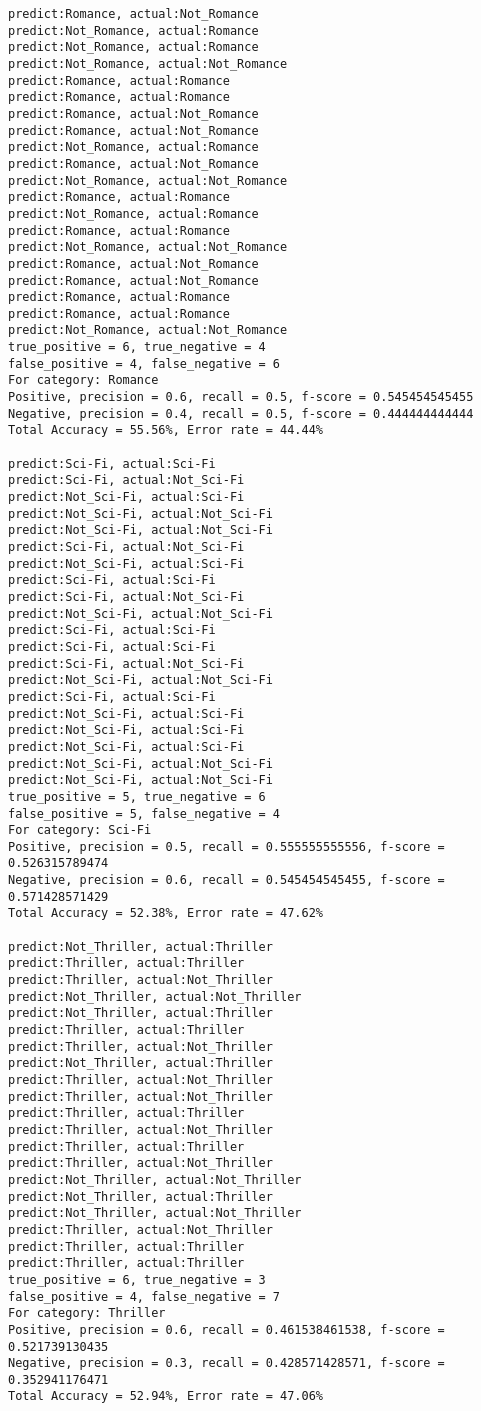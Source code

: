 \documentclass{article}
\begin{document}
\begin{lstlisting}
predict:Romance, actual:Not_Romance
predict:Not_Romance, actual:Romance
predict:Not_Romance, actual:Romance
predict:Not_Romance, actual:Not_Romance
predict:Romance, actual:Romance
predict:Romance, actual:Romance
predict:Romance, actual:Not_Romance
predict:Romance, actual:Not_Romance
predict:Not_Romance, actual:Romance
predict:Romance, actual:Not_Romance
predict:Not_Romance, actual:Not_Romance
predict:Romance, actual:Romance
predict:Not_Romance, actual:Romance
predict:Romance, actual:Romance
predict:Not_Romance, actual:Not_Romance
predict:Romance, actual:Not_Romance
predict:Romance, actual:Not_Romance
predict:Romance, actual:Romance
predict:Romance, actual:Romance
predict:Not_Romance, actual:Not_Romance
true_positive = 6, true_negative = 4
false_positive = 4, false_negative = 6
For category: Romance
Positive, precision = 0.6, recall = 0.5, f-score = 0.545454545455 
Negative, precision = 0.4, recall = 0.5, f-score = 0.444444444444 
Total Accuracy = 55.56%, Error rate = 44.44%

predict:Sci-Fi, actual:Sci-Fi
predict:Sci-Fi, actual:Not_Sci-Fi
predict:Not_Sci-Fi, actual:Sci-Fi
predict:Not_Sci-Fi, actual:Not_Sci-Fi
predict:Not_Sci-Fi, actual:Not_Sci-Fi
predict:Sci-Fi, actual:Not_Sci-Fi
predict:Not_Sci-Fi, actual:Sci-Fi
predict:Sci-Fi, actual:Sci-Fi
predict:Sci-Fi, actual:Not_Sci-Fi
predict:Not_Sci-Fi, actual:Not_Sci-Fi
predict:Sci-Fi, actual:Sci-Fi
predict:Sci-Fi, actual:Sci-Fi
predict:Sci-Fi, actual:Not_Sci-Fi
predict:Not_Sci-Fi, actual:Not_Sci-Fi
predict:Sci-Fi, actual:Sci-Fi
predict:Not_Sci-Fi, actual:Sci-Fi
predict:Not_Sci-Fi, actual:Sci-Fi
predict:Not_Sci-Fi, actual:Sci-Fi
predict:Not_Sci-Fi, actual:Not_Sci-Fi
predict:Not_Sci-Fi, actual:Not_Sci-Fi
true_positive = 5, true_negative = 6
false_positive = 5, false_negative = 4
For category: Sci-Fi
Positive, precision = 0.5, recall = 0.555555555556, f-score = 0.526315789474 
Negative, precision = 0.6, recall = 0.545454545455, f-score = 0.571428571429 
Total Accuracy = 52.38%, Error rate = 47.62%

predict:Not_Thriller, actual:Thriller
predict:Thriller, actual:Thriller
predict:Thriller, actual:Not_Thriller
predict:Not_Thriller, actual:Not_Thriller
predict:Not_Thriller, actual:Thriller
predict:Thriller, actual:Thriller
predict:Thriller, actual:Not_Thriller
predict:Not_Thriller, actual:Thriller
predict:Thriller, actual:Not_Thriller
predict:Thriller, actual:Not_Thriller
predict:Thriller, actual:Thriller
predict:Thriller, actual:Not_Thriller
predict:Thriller, actual:Thriller
predict:Thriller, actual:Not_Thriller
predict:Not_Thriller, actual:Not_Thriller
predict:Not_Thriller, actual:Thriller
predict:Not_Thriller, actual:Not_Thriller
predict:Thriller, actual:Not_Thriller
predict:Thriller, actual:Thriller
predict:Thriller, actual:Thriller
true_positive = 6, true_negative = 3
false_positive = 4, false_negative = 7
For category: Thriller
Positive, precision = 0.6, recall = 0.461538461538, f-score = 0.521739130435 
Negative, precision = 0.3, recall = 0.428571428571, f-score = 0.352941176471 
Total Accuracy = 52.94%, Error rate = 47.06%


\end{lstlisting}
\end{document}
